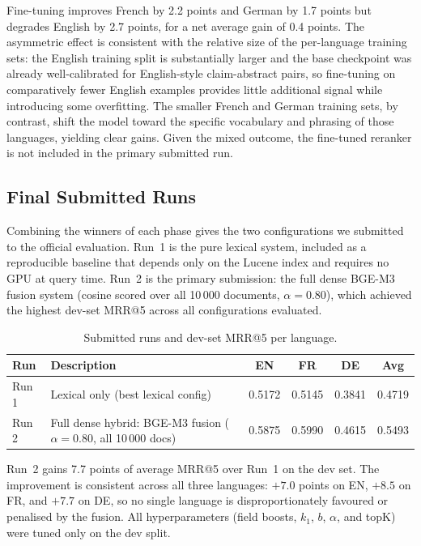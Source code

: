 Fine-tuning improves French by 2.2 points and German by 1.7 points but degrades English by 2.7 points, for a net average gain of 0.4 points. The asymmetric effect is consistent with the relative size of the per-language training sets: the English training split is substantially larger and the base checkpoint was already well-calibrated for English-style claim-abstract pairs, so fine-tuning on comparatively fewer English examples provides little additional signal while introducing some overfitting. The smaller French and German training sets, by contrast, shift the model toward the specific vocabulary and phrasing of those languages, yielding clear gains. Given the mixed outcome, the fine-tuned reranker is not included in the primary submitted run.

\newpage
\subsection{Final Submitted Runs}
\label{subsec:res-final}

Combining the winners of each phase gives the two configurations we submitted to the official evaluation. Run~1 is the pure lexical system, included as a reproducible baseline that depends only on the Lucene index and requires no GPU at query time. Run~2 is the primary submission: the full dense BGE-M3 fusion system (cosine scored over all 10\,000 documents, $\alpha{=}0.80$), which achieved the highest dev-set MRR@5 across all configurations evaluated.

\begin{table}[!ht]
    \caption{Submitted runs and dev-set MRR@5 per language.}
    \label{tab:final-runs}
    \centering
    \begin{tabular}{llcccc}
        \toprule
        Run & Description & EN & FR & DE & Avg \\
        \midrule
        Run 1 & Lexical only (best lexical config)              & 0.5172 & 0.5145 & 0.3841 & 0.4719 \\
        Run 2 & Full dense hybrid: BGE-M3 fusion ($\alpha{=}0.80$, all 10\,000 docs) & 0.5875 & 0.5990 & 0.4615 & 0.5493 \\
        \bottomrule
    \end{tabular}
\end{table}

Run~2 gains 7.7 points of average MRR@5 over Run~1 on the dev set. The improvement is consistent across all three languages: $+7.0$ points on EN, $+8.5$ on FR, and $+7.7$ on DE, so no single language is disproportionately favoured or penalised by the fusion. All hyperparameters (field boosts, $k_1$, $b$, $\alpha$, and topK) were tuned only on the dev split.

